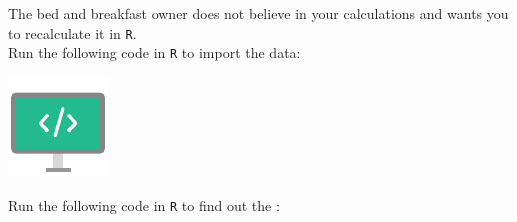 \begin{minipage}{0.8\textwidth}
The bed and breakfast owner does not believe in your calculations and wants you to recalculate it in \texttt{R}. \\

Run the following code in \texttt{R} to import the data: \\
\end{minipage}%
\hfill%
\begin{minipage}{0.1\textwidth}
\includegraphics[width=\linewidth]{Files/Images/displaycode.pdf}
\end{minipage}
\vspace*{.1cm}





Run the following code in \texttt{R} to find out the : \\

